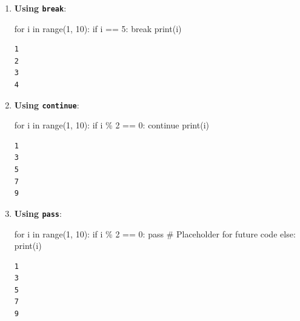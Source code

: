 \documentclass[
  letterpaper,
  DIV=11,
  numbers=noendperiod]{scrreprt}
\newenvironment{Shaded}{\begin{snugshade}}{\end{snugshade}}
\newcommand{\BuiltInTok}[1]{\textcolor[rgb]{0.00,0.23,0.31}{#1}}
\newcommand{\CommentTok}[1]{\textcolor[rgb]{0.37,0.37,0.37}{#1}}
\newcommand{\ControlFlowTok}[1]{\textcolor[rgb]{0.00,0.23,0.31}{#1}}
\newcommand{\DecValTok}[1]{\textcolor[rgb]{0.68,0.00,0.00}{#1}}
\newcommand{\KeywordTok}[1]{\textcolor[rgb]{0.00,0.23,0.31}{#1}}
\newcommand{\NormalTok}[1]{\textcolor[rgb]{0.00,0.23,0.31}{#1}}
\newcommand{\OperatorTok}[1]{\textcolor[rgb]{0.37,0.37,0.37}{#1}}
\begin{document}
\begin{enumerate}
\def\labelenumi{\arabic{enumi}.}
\item
  \textbf{Using \texttt{break}}:

\begin{Shaded}
\begin{Highlighting}[]
\ControlFlowTok{for}\NormalTok{ i }\KeywordTok{in} \BuiltInTok{range}\NormalTok{(}\DecValTok{1}\NormalTok{, }\DecValTok{10}\NormalTok{):}
    \ControlFlowTok{if}\NormalTok{ i }\OperatorTok{==} \DecValTok{5}\NormalTok{:}
        \ControlFlowTok{break}
    \BuiltInTok{print}\NormalTok{(i)}
\end{Highlighting}
\end{Shaded}

\begin{verbatim}
1
2
3
4
\end{verbatim}
\item
  \textbf{Using \texttt{continue}}:

\begin{Shaded}
\begin{Highlighting}[]
\ControlFlowTok{for}\NormalTok{ i }\KeywordTok{in} \BuiltInTok{range}\NormalTok{(}\DecValTok{1}\NormalTok{, }\DecValTok{10}\NormalTok{):}
    \ControlFlowTok{if}\NormalTok{ i }\OperatorTok{\%} \DecValTok{2} \OperatorTok{==} \DecValTok{0}\NormalTok{:}
        \ControlFlowTok{continue}
    \BuiltInTok{print}\NormalTok{(i)}
\end{Highlighting}
\end{Shaded}

\begin{verbatim}
1
3
5
7
9
\end{verbatim}
\item
  \textbf{Using \texttt{pass}}:

\begin{Shaded}
\begin{Highlighting}[]
\ControlFlowTok{for}\NormalTok{ i }\KeywordTok{in} \BuiltInTok{range}\NormalTok{(}\DecValTok{1}\NormalTok{, }\DecValTok{10}\NormalTok{):}
    \ControlFlowTok{if}\NormalTok{ i }\OperatorTok{\%} \DecValTok{2} \OperatorTok{==} \DecValTok{0}\NormalTok{:}
        \ControlFlowTok{pass}  \CommentTok{\# Placeholder for future code}
    \ControlFlowTok{else}\NormalTok{:}
        \BuiltInTok{print}\NormalTok{(i)}
\end{Highlighting}
\end{Shaded}

\begin{verbatim}
1
3
5
7
9
\end{verbatim}
\end{enumerate}
\end{document}
